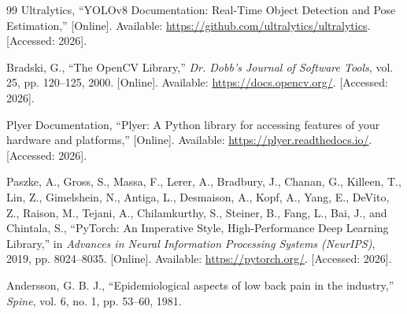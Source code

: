 \documentclass{llncs}
\begin{document}
\begin{thebibliography}{99}
Ultralytics, ``YOLOv8 Documentation: Real-Time Object Detection and Pose Estimation,'' [Online]. Available: \url{https://github.com/ultralytics/ultralytics}. [Accessed: 2026].

Bradski, G., ``The OpenCV Library,'' \textit{Dr. Dobb's Journal of Software Tools}, vol. 25, pp. 120--125, 2000. [Online]. Available: \url{https://docs.opencv.org/}. [Accessed: 2026].

Plyer Documentation, ``Plyer: A Python library for accessing features of your hardware and platforms,'' [Online]. Available: \url{https://plyer.readthedocs.io/}. [Accessed: 2026].

Paszke, A., Gross, S., Massa, F., Lerer, A., Bradbury, J., Chanan, G., Killeen, T., Lin, Z., Gimelshein, N., Antiga, L., Desmaison, A., Kopf, A., Yang, E., DeVito, Z., Raison, M., Tejani, A., Chilamkurthy, S., Steiner, B., Fang, L., Bai, J., and Chintala, S., ``PyTorch: An Imperative Style, High-Performance Deep Learning Library,'' in \textit{Advances in Neural Information Processing Systems (NeurIPS)}, 2019, pp. 8024--8035. [Online]. Available: \url{https://pytorch.org/}. [Accessed: 2026].

Andersson, G. B. J., ``Epidemiological aspects of low back pain in the industry,'' \textit{Spine}, vol. 6, no. 1, pp. 53--60, 1981.

\end{thebibliography}
\end{document}
